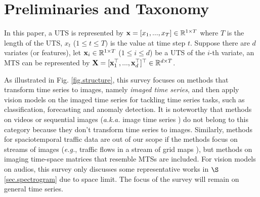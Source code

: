 \section{Preliminaries and Taxonomy}

In this paper, a UTS is represented by ${\bf x}=[x_{1}, ..., x_{T}]\in\mathbb{R}^{1\times T}$ where $T$ is the length of the UTS, $x_{t}$ ($1\le t\le T)$ is the value at time step $t$. %
Suppose there are $d$ variates (or features), let ${\bf x}_{i}\in\mathbb{R}^{1\times T}$ ($1\le i\le d$) be a UTS of the $i$-th variate, an MTS can be represented by ${\bf X}=[{\bf x}_{1}^{\top}, ..., {\bf x}_{d}^{\top}]^{\top}\in\mathbb{R}^{d\times T}$.

As illustrated in Fig. \ref{fig.structure}, this survey focuses on methods that transform time series to images, namely {\em imaged time series}, and then apply vision models %
on the imaged time series for tackling time series tasks, such as classification, forecasting and anomaly detection. It is noteworthy that methods on videos or sequential images ({\em a.k.a.} image time series \cite{tarasiou2023vits}) do not belong to this category because they don't transform time series to images. Similarly, methods for spaciotemporal traffic data are out of our scope if the methods focus on streams of images ({\em e.g.}, traffic flows in a stream of grid maps \cite{zhang2017deep}), but methods on imaging time-space matrices \cite{ma2017learning} that resemble MTSs are included. %
For vision models on audios, this survey %
only discusses %
some representative works in $\S$\ref{sec.spectrogram} due to space limit. %
The focus of the survey will remain on general time series.






